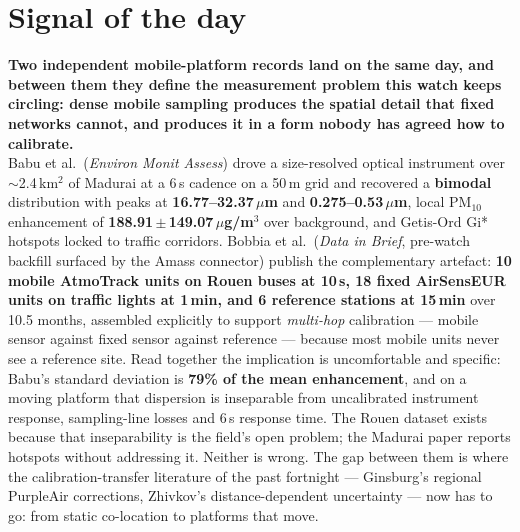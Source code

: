 \documentclass[10pt]{article}
\begin{document}
\vspace{6mm}

\section*{\sffamily\bfseries\color{Deep}Signal of the day}
\vspace{-1.5mm}{\color{Amber}\rule{\linewidth}{1.1pt}}\vspace{2.5mm}

\begin{keybox}
{\sffamily\bfseries\small\color{Deep}Two independent mobile-platform records land on the
same day, and between them they define the measurement problem this watch keeps
circling: dense mobile sampling produces the spatial detail that fixed networks cannot,
and produces it in a form nobody has agreed how to calibrate.}\\[1.4mm]
\footnotesize
Babu et al.\ (\textit{Environ Monit Assess}) drove a size-resolved optical instrument over
$\sim$2.4\,km$^2$ of Madurai at a 6\,s cadence on a 50\,m grid and recovered a
\textbf{bimodal} distribution with peaks at \textbf{16.77--32.37\,$\mu$m} and
\textbf{0.275--0.53\,$\mu$m}, local PM$_{10}$ enhancement of
\textbf{188.91\,$\pm$\,149.07\,$\mu$g/m$^3$} over background, and Getis-Ord Gi* hotspots
locked to traffic corridors. Bobbia et al.\ (\textit{Data in Brief}, pre-watch backfill
surfaced by the Amass connector) publish the complementary artefact: \textbf{10 mobile
AtmoTrack units on Rouen buses at 10\,s, 18 fixed AirSensEUR units on traffic lights at
1\,min, and 6 reference stations at 15\,min} over 10.5 months, assembled explicitly to
support \emph{multi-hop} calibration --- mobile sensor against fixed sensor against
reference --- because most mobile units never see a reference site.
Read together the implication is uncomfortable and specific: Babu's standard deviation is
\textbf{79\% of the mean enhancement}, and on a moving platform that dispersion is
inseparable from uncalibrated instrument response, sampling-line losses and 6\,s response
time. The Rouen dataset exists because that inseparability is the field's open problem;
the Madurai paper reports hotspots without addressing it. Neither is wrong. The gap
between them is where the calibration-transfer literature of the past fortnight ---
Ginsburg's regional PurpleAir corrections, Zhivkov's distance-dependent uncertainty ---
now has to go: from static co-location to platforms that move.
\end{keybox}
\end{document}
